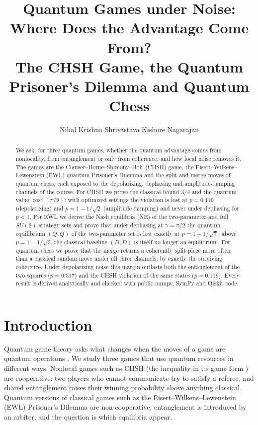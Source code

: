 \documentclass[11pt,a4paper]{article}
\title{Quantum Games under Noise:\\ Where Does the Advantage Come From?\\[2pt]
\large The CHSH Game, the Quantum Prisoner's Dilemma and Quantum Chess}
\author{Nihal Krishna Shrivastava \hspace{2.5em} Kishore Nagarajan}
\date{}
\begin{document}
\maketitle

\begin{abstract}
We ask, for three quantum games, whether the quantum advantage comes from nonlocality, from entanglement or only from coherence, and how local noise removes it. The games are the Clauser--Horne--Shimony--Holt (CHSH) game, the Eisert--Wilkens--Lewenstein (EWL) quantum Prisoner's Dilemma and the split and merge moves of quantum chess, each exposed to the depolarizing, dephasing and amplitude-damping channels of the course. For CHSH we prove the classical bound $3/4$ and the quantum value $\cos^2(\pi/8)$; with optimized settings the violation is lost at $p=0.119$ (depolarizing) and $p=1-1/\sqrt2$ (amplitude damping) and never under dephasing for $p<1$. For EWL we derive the Nash equilibria (NE) of the two-parameter and full $SU(2)$ strategy sets and prove that under dephasing at $\gamma=\pi/2$ the quantum equilibrium $(Q,Q)$ of the two-parameter set is lost exactly at $p=1-1/\sqrt7$; above $p=1-1/\sqrt3$ the classical baseline $(D,D)$ is itself no longer an equilibrium. For quantum chess we prove that the merge returns a coherently split piece more often than a classical random move under all three channels, by exactly the surviving coherence. Under depolarizing noise this margin outlasts both the entanglement of the two squares ($p=0.317$) and the CHSH violation of the same states ($p=0.119$). Every result is derived analytically and checked with public numpy, SymPy and Qiskit code.
\end{abstract}

\section{Introduction}
Quantum game theory asks what changes when the moves of a game are quantum operations \cite{meyer,ewl,flitney-review}. We study three games that use quantum resources in different ways. Nonlocal games such as CHSH (the inequality \cite{chsh} in its game form \cite{cleve}) are cooperative: two players who cannot communicate try to satisfy a referee, and shared entanglement raises their winning probability above anything classical. Quantum versions of classical games such as the Eisert--Wilkens--Lewenstein (EWL) Prisoner's Dilemma \cite{ewl} are non-cooperative: entanglement is introduced by an arbiter, and the question is which equilibria appear.
\end{document}
